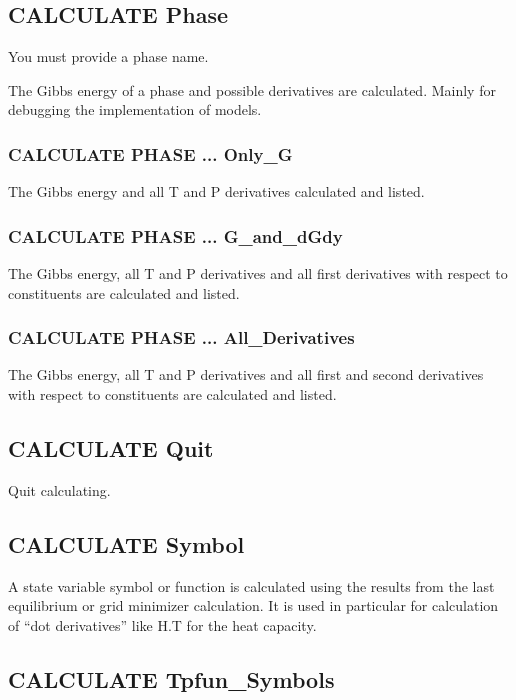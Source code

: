 \documentclass[12pt]{article}
\begin{document}
\subsection{CALCULATE Phase}

You must provide a phase name.

The Gibbs energy of a phase and possible derivatives are calculated.
Mainly for debugging the implementation of models.

\subsubsection{CALCULATE PHASE ... Only\_G}

The Gibbs energy and all T and P derivatives calculated and listed.

\subsubsection{CALCULATE PHASE ... G\_and\_dGdy}

The Gibbs energy, all T and P derivatives and all first
derivatives with respect to constituents are calculated and listed.

\subsubsection{CALCULATE PHASE ... All\_Derivatives}

The Gibbs energy, all T and P derivatives and all first and second
derivatives with respect to constituents are calculated and listed.

\subsection{CALCULATE Quit}

Quit calculating.

\subsection{CALCULATE Symbol}

A state variable symbol or function is calculated using the results
from the last equilibrium or grid minimizer calculation.  It is used
in particular for calculation of ``dot derivatives'' like H.T for the
heat capacity.

\subsection{CALCULATE Tpfun\_Symbols}
\end{document}
